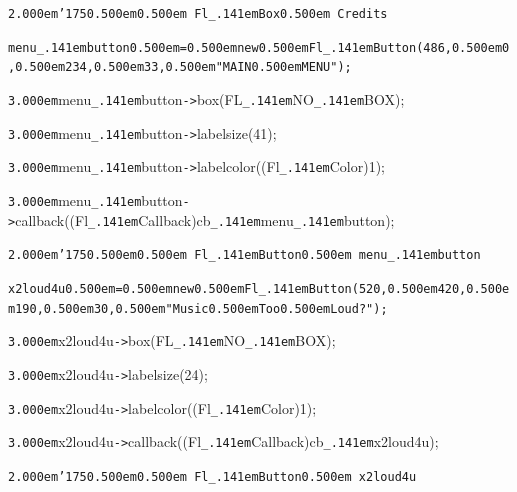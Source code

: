 \documentclass[12pt]{article}
\begin{document}
\noindent
{}{\tt\mc \kern2.000em}{\tt\char'175}{\tt\mc \kern0.500em}\tt\mc {\tt /}{\tt /}\kern0.500em Fl{\tt\_\kern.141em}Box{\tt *}\kern0.500em Credits

\noindent
\tt{}menu{\tt\_\kern.141em}button{\tt\mc \kern0.500em}={\tt\mc \kern0.500em}new{\tt\mc \kern0.500em}Fl{\tt\_\kern.141em}Button(486,{\tt\mc \kern0.500em}0,{\tt\mc \kern0.500em}234,{\tt\mc \kern0.500em}33,{\tt\mc \kern0.500em}{\tt "}MAIN{\tt\mc \kern0.500em}MENU{\tt "});

\noindent
{}{\tt\mc \kern3.000em}menu{\tt\_\kern.141em}button{\tt -}{\tt >}box(FL{\tt\_\kern.141em}NO{\tt\_\kern.141em}BOX);

\noindent
{}{\tt\mc \kern3.000em}menu{\tt\_\kern.141em}button{\tt -}{\tt >}labelsize(41);

\noindent
{}{\tt\mc \kern3.000em}menu{\tt\_\kern.141em}button{\tt -}{\tt >}labelcolor((Fl{\tt\_\kern.141em}Color)1);

\noindent
{}{\tt\mc \kern3.000em}menu{\tt\_\kern.141em}button{\tt -}{\tt >}callback((Fl{\tt\_\kern.141em}Callback{\tt *})cb{\tt\_\kern.141em}menu{\tt\_\kern.141em}button);

\noindent
{}{\tt\mc \kern2.000em}{\tt\char'175}{\tt\mc \kern0.500em}\tt\mc {\tt /}{\tt /}\kern0.500em Fl{\tt\_\kern.141em}Button{\tt *}\kern0.500em menu{\tt\_\kern.141em}button

\noindent
\tt{}x2loud4u{\tt\mc \kern0.500em}={\tt\mc \kern0.500em}new{\tt\mc \kern0.500em}Fl{\tt\_\kern.141em}Button(520,{\tt\mc \kern0.500em}420,{\tt\mc \kern0.500em}190,{\tt\mc \kern0.500em}30,{\tt\mc \kern0.500em}{\tt "}Music{\tt\mc \kern0.500em}Too{\tt\mc \kern0.500em}Loud?{\tt "});

\noindent
{}{\tt\mc \kern3.000em}x2loud4u{\tt -}{\tt >}box(FL{\tt\_\kern.141em}NO{\tt\_\kern.141em}BOX);

\noindent
{}{\tt\mc \kern3.000em}x2loud4u{\tt -}{\tt >}labelsize(24);

\noindent
{}{\tt\mc \kern3.000em}x2loud4u{\tt -}{\tt >}labelcolor((Fl{\tt\_\kern.141em}Color)1);

\noindent
{}{\tt\mc \kern3.000em}x2loud4u{\tt -}{\tt >}callback((Fl{\tt\_\kern.141em}Callback{\tt *})cb{\tt\_\kern.141em}x2loud4u);

\noindent
{}{\tt\mc \kern2.000em}{\tt\char'175}{\tt\mc \kern0.500em}\tt\mc {\tt /}{\tt /}\kern0.500em Fl{\tt\_\kern.141em}Button{\tt *}\kern0.500em x2loud4u
\end{document}
